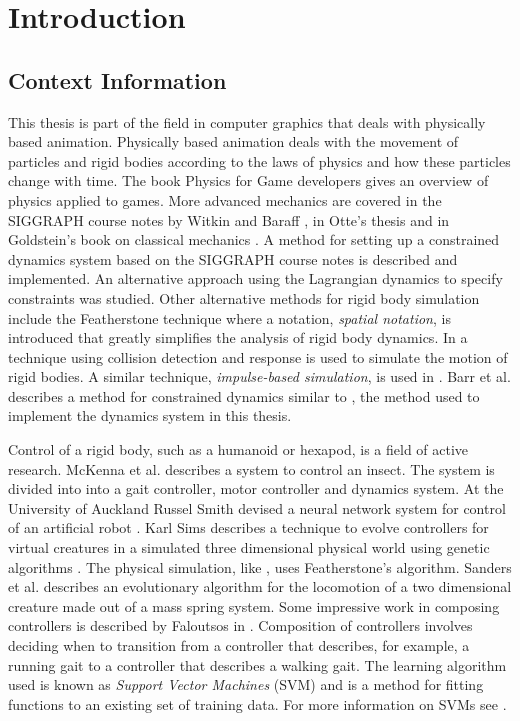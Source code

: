 \chapter{Introduction}
\label{sec:Introduction}
\section{Context Information}
\label{Sec:ContextInformation}
This thesis is part of the field in computer graphics that deals with
physically based animation. Physically based animation deals with the movement
of particles and rigid bodies according to the laws of physics and how these
particles change with time. The book Physics for Game developers \cite{Bourg}
gives an overview of physics applied to games.  More advanced mechanics are
covered in the SIGGRAPH course notes by Witkin and Baraff \cite{PBMNotes}, in
Otte's thesis \cite{Otte} and in Goldstein's book on classical mechanics
\cite{Goldstein}.  A method for setting up a constrained dynamics system based
on the SIGGRAPH course notes \cite{PBMNotes} is described and implemented. An
alternative approach using the Lagrangian dynamics to specify constraints was
studied. Other alternative methods for rigid body simulation include the
Featherstone technique \cite{Featherstone} where a notation, \textit{spatial
notation}, is introduced that greatly simplifies the analysis of rigid body
dynamics. In \cite{Hahn} a technique using collision detection and response is
used to simulate the motion of rigid bodies. A similar technique,
\textit{impulse-based simulation}, is used in \cite{Mirtich}. Barr et al.
\cite{BarzelBarr} describes a method for constrained dynamics similar to
\cite{PBMNotes}, the method used to implement the dynamics system in this
thesis.

Control of a rigid body, such as a humanoid or hexapod, is a field of active
research. McKenna et al. \cite{McKennaZeltzer} describes a system to control an
insect. The system is divided into into a gait controller, motor controller and
dynamics system.  At the University of Auckland Russel Smith devised a neural
network system for control of an artificial robot \cite{RusselSmith}. Karl Sims
describes a technique to evolve controllers for virtual creatures in a
simulated three dimensional physical world using genetic algorithms
\cite{Sims}. The physical simulation, like \cite{McKennaZeltzer}, uses
Featherstone's algorithm. Sanders et al.  \cite{SandersLobbRiddle} describes an
evolutionary algorithm for the locomotion of a two dimensional creature made
out of a mass spring system.  Some impressive work in composing controllers is
described by Faloutsos in \cite{FaloutsosvandePanneTerzopolous}. Composition of
controllers involves deciding when to transition from a controller that
describes, for example, a running gait to a controller that describes a walking
gait. The learning algorithm used is known as \textit{Support Vector Machines}
(SVM) and is a method for fitting functions to an existing set of training
data. For more information on SVMs see \cite{BennetCampbell, Burges}.

